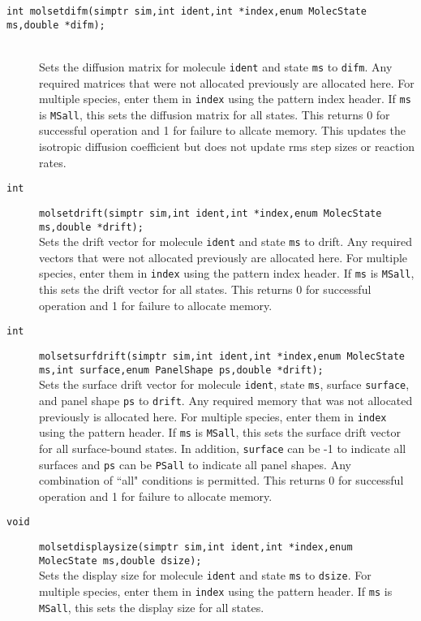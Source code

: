 \documentclass {scrbook}
\newcommand {\ttt} {\texttt}
\begin{document}
\begin{description}
\item[\ttt{int molsetdifm(simptr sim,int ident,int *index,enum MolecState ms,double *difm);}]
\hfill \\
Sets the diffusion matrix for molecule \ttt{ident} and state \ttt{ms} to \ttt{difm}. Any required matrices that were not allocated previously are allocated here. For multiple species, enter them in \ttt{index} using the pattern index header. If \ttt{ms} is \ttt{MSall}, this sets the diffusion matrix for all states. This returns 0 for successful operation and 1 for failure to allcate memory. This updates the isotropic diffusion coefficient but does not update rms step sizes or reaction rates.

\item[\ttt{int}]
\ttt{molsetdrift(simptr sim,int ident,int *index,enum MolecState ms,double *drift);}
\hfill \\
Sets the drift vector for molecule \ttt{ident} and state \ttt{ms} to drift. Any required vectors that were not allocated previously are allocated here. For multiple species, enter them in \ttt{index} using the pattern index header. If \ttt{ms} is \ttt{MSall}, this sets the drift vector for all states. This returns 0 for successful operation and 1 for failure to allocate memory.

\item[\ttt{int}]
\ttt{molsetsurfdrift(simptr sim,int ident,int *index,enum MolecState ms,int surface,enum PanelShape ps,double *drift);}
\hfill \\
Sets the surface drift vector for molecule \ttt{ident}, state \ttt{ms}, surface \ttt{surface}, and panel shape \ttt{ps} to \ttt{drift}. Any required memory that was not allocated previously is allocated here. For multiple species, enter them in \ttt{index} using the pattern header. If \ttt{ms} is \ttt{MSall}, this sets the surface drift vector for all surface-bound states. In addition, \ttt{surface} can be -1 to indicate all surfaces and \ttt{ps} can be \ttt{PSall} to indicate all panel shapes. Any combination of ``all" conditions is permitted. This returns 0 for successful operation and 1 for failure to allocate memory.

\item[\ttt{void}]
\ttt{molsetdisplaysize(simptr sim,int ident,int *index,enum MolecState ms,double dsize);}
\hfill \\
Sets the display size for molecule \ttt{ident} and state \ttt{ms} to \ttt{dsize}. For multiple species, enter them in \ttt{index} using the pattern header. If \ttt{ms} is \ttt{MSall}, this sets the display size for all states.


\end{description}
\end{document}
